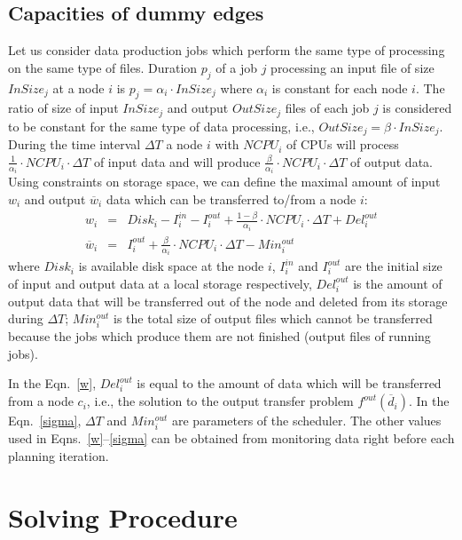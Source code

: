 \documentclass{svjour3}                     %
\begin{document}
\subsection{Capacities of dummy edges}
Let us consider data production jobs which perform the same type of processing
on the same type of files. Duration $p_{j}$ of a job $j$  processing an input
file of size $InSize_{j}$ at a node $i$ is $p_{j} = \alpha_{i} \cdot
InSize_{j}$ where $\alpha_{i}$ is constant for each node $i$.  The ratio of
size of input $InSize_{j}$ and output $OutSize_{j}$ files of each job $j$ is
considered to be constant for the same type of data processing, i.e.,
$OutSize_{j} = \beta \cdot InSize_{j}$.  During the time interval $\Delta T$ a
node $i$ with $NCPU_{i}$  of CPUs  will process $\frac{1}{\alpha_{i}} \cdot
NCPU_{i} \cdot \Delta T$ of input data and will produce
$\frac{\beta}{\alpha_{i}} \cdot NCPU_{i} \cdot \Delta T$ of output data.
Using constraints on storage space, we can define the maximal amount of input
$w_{i}$ and output $\overline{w}_{i}$ data which can be transferred to/from a
node $i$:
%
\begin{eqnarray}
w_{i} &=&
Disk_{i} - I_{i}^{in} - I_{i}^{out} + \frac{1 - \beta}{\alpha_{i}} \cdot
NCPU_{i} \cdot \Delta T + Del_{i}^{out} \label{w}\\
\overline{w}_{i} &=& I_{i}^{out} + \frac{\beta}{\alpha_{i}} \cdot NCPU_{i} \cdot \Delta T - Min_{i}^{out} \label{sigma}
\end{eqnarray}  
%
where $Disk_{i}$ is available disk space at the node $i$, $I_{i}^{in}$ and
$I_{i}^{out}$ are the initial size of input and output data at a local storage
respectively, $Del_{i}^{out}$ is the amount of output data that will be
transferred out of the node and deleted from its storage during $\Delta T$;
$Min_{i}^{out}$ is the total size of output files which cannot be transferred
because the jobs which produce them are not finished (output files of running
jobs). 

In the Eqn.~\ref{w}, $Del_{i}^{out}$ is equal to the amount of data which will
be transferred from a node $c_{i}$, i.e., the solution to the output transfer
problem $f^{out}(\overline{d}_{i})$. In the Eqn.~\ref{sigma}, $\Delta T$ and
$Min_{i}^{out}$ are parameters of the scheduler. The other values used in
Eqns.~\ref{w}--\ref{sigma} can be obtained from monitoring data right before
each planning iteration.

\section{Solving Procedure}
\label{solve}
\end{document}
